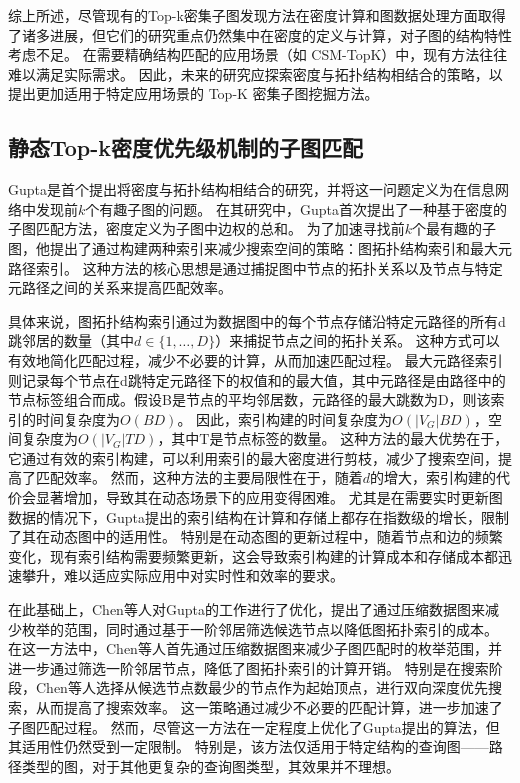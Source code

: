 综上所述，尽管现有的Top-k密集子图发现方法在密度计算和图数据处理方面取得了诸多进展，但它们的研究重点仍然集中在密度的定义与计算，对子图的结构特性考虑不足。
在需要精确结构匹配的应用场景（如 CSM-TopK）中，现有方法往往难以满足实际需求。
因此，未来的研究应探索密度与拓扑结构相结合的策略，以提出更加适用于特定应用场景的 Top-K 密集子图挖掘方法。
\subsection{静态Top-k密度优先级机制的子图匹配}
Gupta\cite{static-topk-Gupta-DBLP:conf/icde/GuptaGYCH14}是首个提出将密度与拓扑结构相结合的研究，并将这一问题定义为在信息网络中发现前$k$个有趣子图的问题。
在其研究中，Gupta首次提出了一种基于密度的子图匹配方法，密度定义为子图中边权的总和。
为了加速寻找前$k$个最有趣的子图，他提出了通过构建两种索引来减少搜索空间的策略：图拓扑结构索引和最大元路径索引。
这种方法的核心思想是通过捕捉图中节点的拓扑关系以及节点与特定元路径之间的关系来提高匹配效率。

具体来说，图拓扑结构索引通过为数据图中的每个节点存储沿特定元路径的所有d跳邻居的数量（其中$d \in \{1,\dots,D\}$）来捕捉节点之间的拓扑关系。
这种方式可以有效地简化匹配过程，减少不必要的计算，从而加速匹配过程。
最大元路径索引则记录每个节点在d跳特定元路径下的权值和的最大值，其中元路径是由路径中的节点标签组合而成。假设B是节点的平均邻居数，元路径的最大跳数为D，则该索引的时间复杂度为$O(BD)$。
因此，索引构建的时间复杂度为$O(|V_G|BD)$，空间复杂度为$O(|V_G|TD)$，其中T是节点标签的数量。
这种方法的最大优势在于，它通过有效的索引构建，可以利用索引的最大密度进行剪枝，减少了搜索空间，提高了匹配效率。
然而，这种方法的主要局限性在于，随着$d$的增大，索引构建的代价会显著增加，导致其在动态场景下的应用变得困难。
尤其是在需要实时更新图数据的情况下，Gupta提出的索引结构在计算和存储上都存在指数级的增长，限制了其在动态图中的适用性。
特别是在动态图的更新过程中，随着节点和边的频繁变化，现有索引结构需要频繁更新，这会导致索引构建的计算成本和存储成本都迅速攀升，难以适应实际应用中对实时性和效率的要求。


在此基础上，Chen\cite{static-topk-Chen-DBLP:journals/ijprai/ChenLCTL18}等人对Gupta的工作进行了优化，提出了通过压缩数据图来减少枚举的范围，同时通过基于一阶邻居筛选候选节点以降低图拓扑索引的成本。
在这一方法中，Chen等人首先通过压缩数据图来减少子图匹配时的枚举范围，并进一步通过筛选一阶邻居节点，降低了图拓扑索引的计算开销。
特别是在搜索阶段，Chen\cite{static-topk-Chen-DBLP:journals/ijprai/ChenLCTL18}等人选择从候选节点数最少的节点作为起始顶点，进行双向深度优先搜索，从而提高了搜索效率。
这一策略通过减少不必要的匹配计算，进一步加速了子图匹配过程。
然而，尽管这一方法在一定程度上优化了Gupta提出的算法，但其适用性仍然受到一定限制。
特别是，该方法仅适用于特定结构的查询图——路径类型的图，对于其他更复杂的查询图类型，其效果并不理想。

